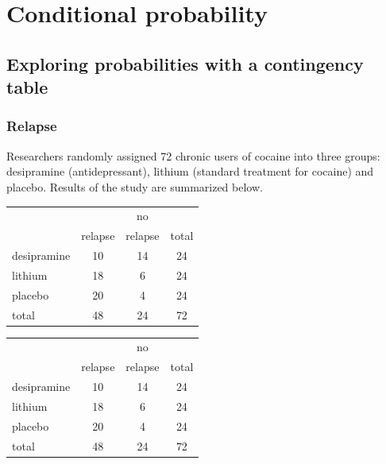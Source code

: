 
\section{Conditional probability}


\subsection{Exploring probabilities with a contingency table}


\begin{frame}
\frametitle{Relapse}

Researchers randomly assigned 72 chronic users of cocaine into three groups: desipramine (antidepressant), lithium (standard treatment for cocaine) and placebo. Results of the study are summarized below.

{\small
\begin{center}
\begin{tabular}{l | c c | c}
			& 		& no 		&  \\
			& relapse	& relapse	& total \\
\hline
desipramine	& 10		& 14		& 24 \\
lithium		& 18		& 6		& 24 \\
placebo		& 20		& 4		& 24 \\
\hline
total			& 48		& 24		& 72
\end{tabular}
\end{center}
}


\end{frame}


\begin{frame}



{\small
\begin{center}
\begin{tabular}{l | c c | c}
			& 		& no 		&  \\
			& relapse	& relapse	& total \\
\hline
desipramine	& 10		& 14		& 24 \\
lithium		& 18		& 6		& 24 \\
placebo		& 20		& 4		& 24 \\
\hline
total			& 48		& 24		& 72
\end{tabular}
\end{center}
}

\end{frame}

